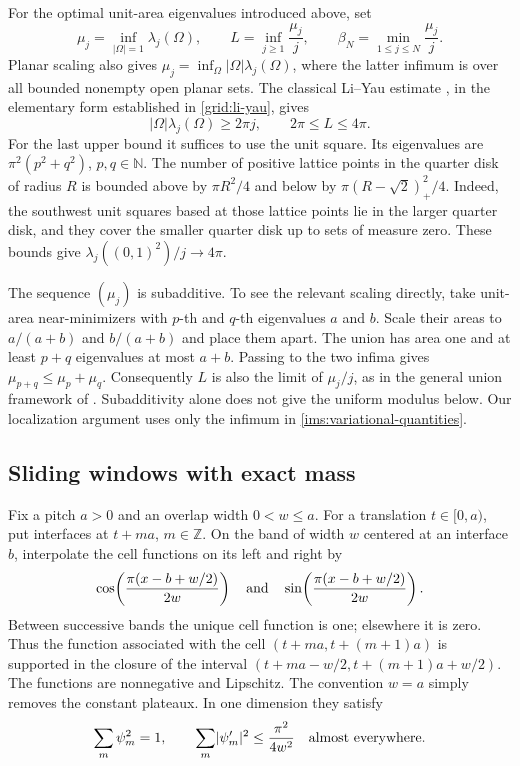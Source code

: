 \documentclass[11pt,reqno]{amsart}
\numberwithin{equation}{section}
\newcommand{\N}{\mathbb N}
\newcommand{\Z}{\mathbb Z}
\newcommand{\abs}[1]{\lvert#1\rvert}
\newcommand{\Om}{\Omega}
\begin{document}
For the optimal unit-area eigenvalues introduced above, set
\begin{equation}
 \mu_j=\inf_{\abs{\Om}=1}\lambda_j(\Om),\qquad
 L=\inf_{j\geq1}\frac{\mu_j}{j},\qquad
 \beta_N=\min_{1\leq j\leq N}\frac{\mu_j}{j}.
 \label{ims:variational-quantities}
\end{equation}
Planar scaling also gives
$\mu_j=\inf_{\Om}\abs{\Om}\lambda_j(\Om)$, where the latter
infimum is over all bounded nonempty open planar sets.
The classical Li--Yau estimate \cite{LiYau1983}, in the elementary
form established in \eqref{grid:li-yau}, gives
\begin{equation}
 \abs{\Om}\lambda_j(\Om)\geq2\pi j,
 \qquad 2\pi\leq L\leq4\pi.
 \label{ims:coarse-bounds}
\end{equation}
For the last upper bound it suffices to use the unit square.  Its
eigenvalues are $\pi^2(p^2+q^2)$, $p,q\in\N$.  The number of
positive lattice points in the quarter disk of radius $R$ is bounded
above by $\pi R^2/4$ and below by
$\pi(R-\sqrt2)_+^2/4$.  Indeed, the southwest unit squares based
at those lattice points lie in the larger quarter disk, and they cover
the smaller quarter disk up to sets of measure zero.  These bounds
give $\lambda_j((0,1)^2)/j\longrightarrow4\pi$.

The sequence $(\mu_j)$ is subadditive.  To see the relevant scaling
directly, take unit-area near-minimizers with $p$-th and $q$-th
eigenvalues $a$ and $b$.  Scale their areas to $a/(a+b)$ and
$b/(a+b)$ and place them apart.  The union has area one and at least
$p+q$ eigenvalues at most $a+b$.  Passing to the two infima gives
$\mu_{p+q}\leq\mu_p+\mu_q$.  Consequently $L$ is also the limit
of $\mu_j/j$, as in the general union framework of
\cite{ColboisElSoufi2014}.  Subadditivity alone does not give the
uniform modulus below.  Our localization argument uses only the
infimum in \eqref{ims:variational-quantities}.

\subsection{Sliding windows with exact mass}
\label{ims:windows}

Fix a pitch $a>0$ and an overlap width $0<w\leq a$.
For a translation $t\in[0,a)$, put interfaces at $t+ma$, $m\in\Z$.
On the band of width $w$ centered at an interface $b$, interpolate
the cell functions on its left and right by
\[
 \cos\!\left(\frac{\pi(x-b+w/2)}{2w}\right)
 \quad\hbox{and}\quad
 \sin\!\left(\frac{\pi(x-b+w/2)}{2w}\right).
\]
Between successive bands the unique cell function is one; elsewhere
it is zero.  Thus the function associated with the cell
$(t+ma,t+(m+1)a)$ is supported in the closure of the interval
$(t+ma-w/2,t+(m+1)a+w/2)$.  The functions are nonnegative and
Lipschitz.  The convention $w=a$ simply removes the constant
plateaux.  In one dimension they satisfy
\[
 \sum_m\psi_m^2=1,
 \qquad
 \sum_m\abs{\psi_m'}^2\leq\frac{\pi^2}{4w^2}
 \quad\hbox{almost everywhere}.
\]
\end{document}
